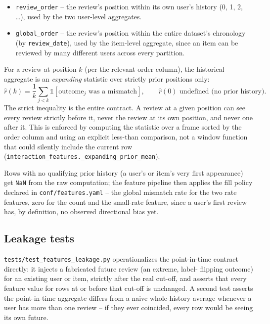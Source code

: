 \begin{itemize}
  \item \texttt{review\_order} -- the review's position within its own
        user's history (0, 1, 2, \ldots), used by the two user-level
        aggregates.
  \item \texttt{global\_order} -- the review's position within the entire
        dataset's chronology (by \texttt{review\_date}), used by the
        item-level aggregate, since an item can be reviewed by many
        different users across every partition.
\end{itemize}

For a review at position $k$ (per the relevant order column), the historical
aggregate is an \emph{expanding} statistic over strictly prior positions
only:
\begin{equation}
  \widehat{r}(k) = \frac{1}{k} \sum_{j < k} \mathbb{1}[\text{outcome}_j
  \text{ was a mismatch}], \qquad \widehat{r}(0) \text{ undefined (no prior
  history)}.
\end{equation}
The strict inequality is the entire contract. A review at a given position
can see every review strictly before it, never the review at its own
position, and never one after it. This is enforced by computing the
statistic over a frame sorted by the order column and using an explicit
less-than comparison, not a window function that could silently include the
current row (\texttt{interaction\_features.\_expanding\_prior\_mean}).

Rows with no qualifying prior history (a user's or item's very first
appearance) get \texttt{NaN} from the raw computation; the feature pipeline
then applies the fill policy declared in \texttt{conf/features.yaml} -- the
global mismatch rate for the two rate features, zero for the count and the
small-rate feature, since a user's first review has, by definition, no
observed directional bias yet.

\subsection{Leakage tests}

\texttt{tests/test\_features\_leakage.py} operationalizes the point-in-time
contract directly: it injects a fabricated future review (an extreme, label-
flipping outcome) for an existing user or item, strictly after the real
cut-off, and asserts that every feature value for rows at or before that
cut-off is unchanged. A second test asserts the point-in-time aggregate
differs from a naive whole-history average whenever a user has more than one
review -- if they ever coincided, every row would be seeing its own future.

